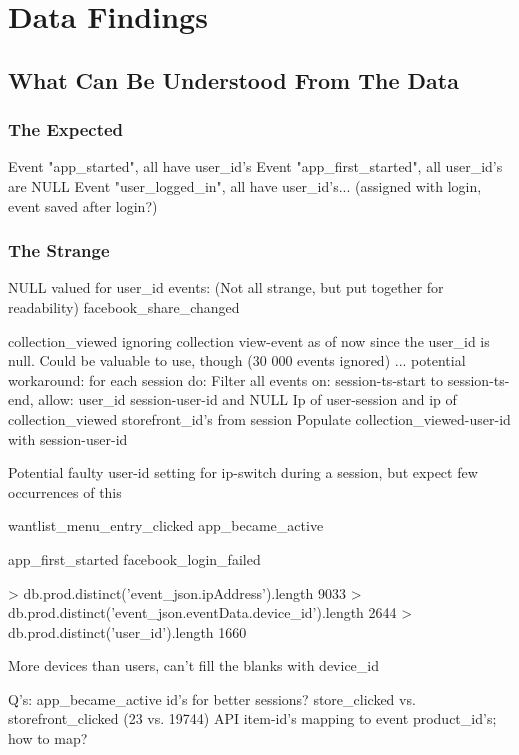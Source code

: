 \section{Data Findings}
\subsection{What Can Be Understood From The Data}



\subsubsection{The Expected}
Event "app\_started", all have user\_id's
Event "app\_first\_started", all user\_id's are NULL
Event "user\_logged\_in", all have user\_id's... (assigned with login, event saved after login?)

\subsubsection{The Strange}
NULL valued  for user\_id events: (Not all strange, but put together for readability)
facebook\_share\_changed

collection\_viewed  ignoring collection view-event as of now since the user\_id
is null. Could be valuable to use, though (30 000 events ignored) ...
potential workaround:
    for each session do:
        Filter all events on:
            session-ts-start to session-ts-end,
            allow: user\_id session-user-id and NULL
            Ip of user-session and ip of collection\_viewed
            storefront\_id's from session
                Populate collection\_viewed-user-id with session-user-id

Potential faulty user-id setting for ip-switch during a session, but expect few
occurrences of this

wantlist\_menu\_entry\_clicked
app\_became\_active

app\_first\_started
facebook\_login\_failed

> db.prod.distinct('event\_json.ipAddress').length
9033
> db.prod.distinct('event\_json.eventData.device\_id').length
2644
> db.prod.distinct('user\_id').length
1660

More devices than users, can't fill the blanks with device\_id

Q's:
    app\_became\_active id's for better sessions?
    store\_clicked vs. storefront\_clicked (23 vs. 19744)
    API item-id's mapping to event product\_id's; how to map?



